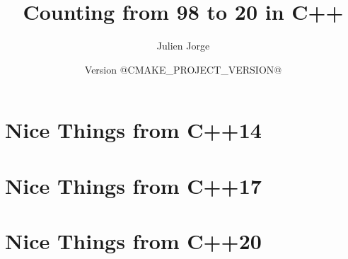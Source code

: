 \documentclass{book}
\title{Counting from 98 to 20 in C++}
\author{Julien Jorge}
\date{Version @CMAKE_PROJECT_VERSION@}
\begin{document}
\maketitle

\tableofcontents





\chapter{Nice Things from C++14}
\chapter{Nice Things from C++17}
\chapter{Nice Things from C++20}
\end{document}
